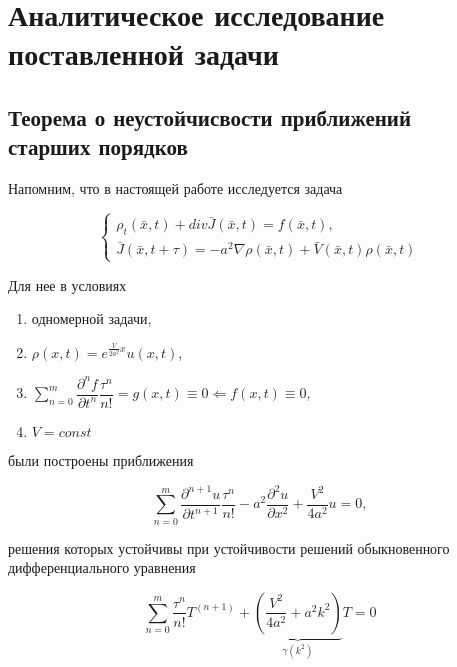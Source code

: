 \section{Аналитическое исследование\\поставленной задачи}

\subsection{Теорема о неустойчисвости приближений\\старших порядков}

Напомним, что в настоящей работе исследуется задача

\begin{equation}
\left\{
\begin{aligned}
\rho_t(\bar{x},t) + div \bar{J}(\bar{x},t) = f(\bar{x},t),\\
\bar{J}(\bar{x},t+\tau) = -a^2 \nabla \rho(\bar{x},t) + \bar{V}(\bar{x},t) \rho(\bar{x},t)
\end{aligned}
\right.
\end{equation}

Для нее в условиях

\begin{enumerate}\label{eq:init-modelled}
\item одномерной задачи,
\item $\rho (x,t) = e^{\frac{V}{2a^2} x} u(x,t)$,
\item $\sum\limits_{n=0}^{m} \dfrac{\partial^n f}{\partial t^n} \dfrac{\tau^n}{n!} = g(x,t) \equiv 0 \Leftarrow f(x,t) \equiv 0$,
\item $V=const$
\end{enumerate}

были построены приближения

\begin{equation}\label{eq:transfer-modelled}
\sum\limits_{n=0}^{m} \dfrac{\partial^{n+1} u}{\partial t^{n+1}} \dfrac{\tau^n}{n!} - a^2 \dfrac{\partial^2 u}{\partial x^2} + \dfrac{V^2}{4a^2} u = 0,
\end{equation}

решения которых устойчивы при устойчивости решений обыкновенного дифференциального уравнения

\begin{equation}\label{eq:ODE-modelled}
\sum\limits_{n=0}^{m} \dfrac{\tau^n}{n!} T^{(n+1)} + \underbrace{ \left( \dfrac{V^2}{4a^2} + a^2 k^2 \right)}_{\gamma(k^2)} T = 0
\end{equation}

